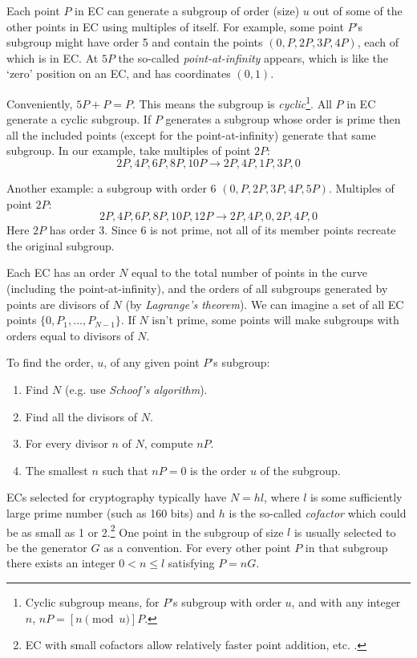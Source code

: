Each point $P$ in EC can generate a subgroup of order (size) $u$ out of some of the other points in EC using multiples of itself. For example, some point $P$’s subgroup might have order 5 and contain the points $(0, P, 2P, 3P, 4P)$, each of which is in EC. At $5P$ the so-called {\em point-at-infinity} appears, which is like the `zero’ position on an EC, and has coordinates $(0, 1)$. 

Conveniently, $5P + P = P$. This means the subgroup is {\em cyclic}\footnote{\label{cyclical_note}Cyclic subgroup means, for $P$'s subgroup with order $u$, and with any integer $n$, $n P = [n \pmod{u}] P$.}. All $P$ in EC generate a cyclic subgroup. If $P$ generates a subgroup whose order is prime then all the included points (except for the point-at-infinity) generate that same subgroup. In our example, take multiples of point $2P$:\vspace{.2cm}
\[2P, 4P, 6P, 8P, 10P \rightarrow 2P, 4P, 1P, 3P, 0\]

Another example: a subgroup with order 6 $(0, P, 2P, 3P, 4P, 5P)$. Multiples of point $2P$: \vspace{.2cm}
\[2P, 4P, 6P, 8P, 10P, 12P \rightarrow 2P, 4P, 0, 2P, 4P, 0\]
Here $2P$ has order 3. Since 6 is not prime, not all of its member points recreate the original subgroup.

Each EC has an order $N$ equal to the total number of points in the curve (including the point-at-infinity), and the orders of all subgroups generated by points are divisors of $N$ (by {\em Lagrange’s theorem}). We can imagine a set of all EC points $\{0,P_1,...,P_{N-1}\}$. If $N$ isn't prime, some points will make subgroups with orders equal to divisors of $N$.

To find the order, $u$, of any given point $P$'s subgroup:
\begin{enumerate}
    \item Find $N$ (e.g. use {\em Schoof's algorithm}).
    \item Find all the divisors of $N$.
    \item For every divisor $n$ of $N$, compute $n P$.
    \item The smallest $n$ such that $n P = 0$ is the order $u$ of the subgroup.
\end{enumerate} 

ECs selected for cryptography typically have $N = hl$, where $l$ is some sufficiently large prime number (such as 160 bits) and $h$ is the so-called {\em cofactor} which could be as small as 1 or 2.\footnote{EC with small cofactors allow relatively faster point addition, etc. \cite{Bernstein2008}.} One point in the subgroup of size $l$ is usually selected to be the generator $G$ as a convention. For every other point $P$ in that subgroup there exists an integer $0 < n \leq l$ satisfying $P = n G$.

